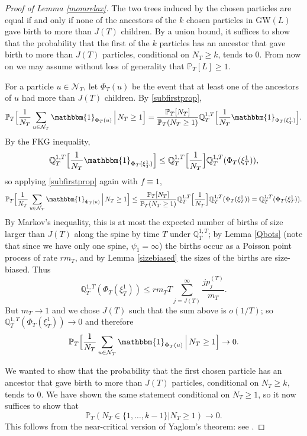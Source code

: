 \documentclass{article}
\theoremstyle{plain}
\theoremstyle{definition}
\newcommand{\Q}{\mathbb{Q}}
\renewcommand{\P}{\mathbb{P}}
\newcommand{\ind}{\mathbbm{1}}
\begin{document}
\begin{proof}[Proof of Lemma \ref{momrelax}]
The two trees induced by the chosen particles are equal if and only if none of the ancestors of the $k$ chosen particles in GW$(L)$ gave birth to more than $J(T)$ children. By a union bound, it suffices to show that the probability that the first of the $k$ particles has an ancestor that gave birth to more than $J(T)$ particles, conditional on $N_T\ge k$, tends to $0$. From now on we may assume without loss of generality that $\P_T[L]\ge 1$.

For a particle $u\in \mathcal N_T$, let $\Phi_T(u)$ be the event that at least one of the ancestors of $u$ had more than $J(T)$ children. By \eqref{subfirstprop},
\[\P_T\Big[\frac{1}{N_T}\sum_{u\in \mathcal N_T} \ind_{\Phi_T(u)}\,\Big|\, N_T\ge 1 \Big] = \frac{\P_T[N_T]}{\P_T(N_T\ge 1)} \Q^{1,T}_T\Big[\frac{1}{N_T}\ind_{\Phi_T(\xi^1_T)}\Big].\]
By the FKG inequality,
\[\Q^{1,T}_T\Big[\frac{1}{N_T}\ind_{\Phi_T(\xi^1_T)}\Big] \le \Q_T^{1,T}\Big[\frac{1}{N_T}\Big]\Q_T^{1,T}(\Phi_T(\xi^1_T)),\]
so applying \eqref{subfirstprop} again with $f\equiv 1$,
\[\P_T\Big[\frac{1}{N_T}\sum_{u\in \mathcal N_T} \ind_{\Phi_T(u)}\,\Big|\, N_T\ge 1 \Big] \le \frac{\P_T[N_T]}{\P_T(N_T\ge 1)} \Q^{1,T}_T\Big[\frac{1}{N_T}\Big]\Q^{1,T}_T(\Phi_T(\xi^1_T)) = \Q^{1,T}_T(\Phi_T(\xi^1_T)).\]
By Markov's inequality, this is at most the expected number of births of size larger than $J(T)$ along the spine by time $T$ under $\Q^{1,T}_T$; by Lemma \ref{Qbots} (note that since we have only one spine, $\psi_1=\infty$) the births occur as a Poisson point process of rate $r m_T$, and by Lemma \ref{sizebiased} the sizes of the births are size-biased. Thus
\[\Q^{1,T}_T(\Phi_T(\xi^1_T)) \le r m_T T \sum_{j=J(T)}^\infty \frac{j p_j^{(T)}}{m_T}.\]
But $m_T\to 1$ and we chose $J(T)$ such that the sum above is $o(1/T)$; so $\Q^{1,T}_T(\Phi_T(\xi^1_T))\to 0$ and therefore
\[\P_T\Big[\frac{1}{N_T}\sum_{u\in \mathcal N_T} \ind_{\Phi_T(u)}\,\Big|\, N_T\ge 1 \Big] \to 0.\]

We wanted to show that the probability that the first chosen particle has an ancestor that gave birth to more than $J(T)$ particles, conditional on $N_T\ge k$, tends to $0$. We have shown the same statement conditional on $N_T\ge 1$, so it now suffices to show that
\[\P_T(N_T\in\{1,\ldots,k-1\}|N_T\ge 1)\to 0.\]
This follows from the near-critical version of Yaglom's theorem: see \cite[Theorem 2]{fahady_et_al:heavy_traffic_GW}.
\end{proof}
\end{document}
